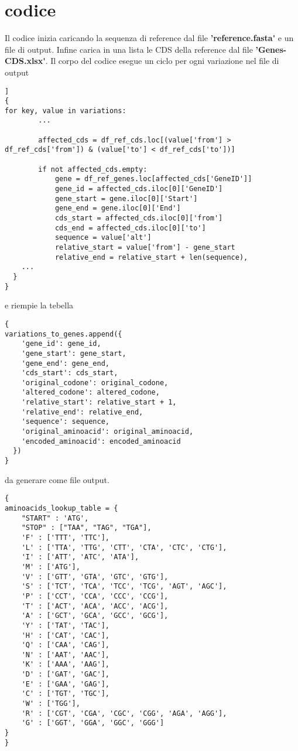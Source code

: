 \documentclass[11pt,italian]{article}
\begin{document}
\section{codice}
	Il codice inizia caricando la sequenza di reference dal file \textbf{'reference.fasta\'} e un file di output.\newline %
	Infine carica in una lista le CDS della reference dal file \textbf{'Genes-CDS.xlsx\'}. \newline
	Il  corpo del codice esegue un ciclo per ogni variazione nel file di output 
	\begin{lstlisting}[basicstyle=\small\ttfamily,caption=Porzione di ciclo,label=code:variations_to_genes = []]
{
for key, value in variations:
        ...
        
        affected_cds = df_ref_cds.loc[(value['from'] > df_ref_cds['from']) & (value['to'] < df_ref_cds['to'])]

        if not affected_cds.empty:
            gene = df_ref_genes.loc[affected_cds['GeneID']]
            gene_id = affected_cds.iloc[0]['GeneID']
            gene_start = gene.iloc[0]['Start']
            gene_end = gene.iloc[0]['End']
            cds_start = affected_cds.iloc[0]['from']
            cds_end = affected_cds.iloc[0]['to']
            sequence = value['alt']
            relative_start = value['from'] - gene_start
            relative_end = relative_start + len(sequence),
    ...
  }
}
\end{lstlisting}
	e riempie la tebella
\begin{lstlisting}[basicstyle=\small\ttfamily,caption=Appending nel file di output,label=code:variations_to_genes]
{
variations_to_genes.append({
	'gene_id': gene_id,
	'gene_start': gene_start,
	'gene_end': gene_end,
	'cds_start': cds_start,
	'original_codone': original_codone,
	'altered_codone': altered_codone,
	'relative_start': relative_start + 1,
	'relative_end': relative_end,
	'sequence': sequence,
	'original_aminoacid': original_aminoacid,
	'encoded_aminoacid': encoded_aminoacid
  })
}
\end{lstlisting}	
	da generare come file output.
	\newpage
\begin{lstlisting}[basicstyle=\small\ttfamily,caption=Tabella per la traduzione in amminoacidi,label=code:aminoacids_table]
{
aminoacids_lookup_table = {
    "START" : 'ATG',
    "STOP" : ["TAA", "TAG", "TGA"],
    'F' : ['TTT', 'TTC'],
    'L' : ['TTA', 'TTG', 'CTT', 'CTA', 'CTC', 'CTG'],
    'I' : ['ATT', 'ATC', 'ATA'],
    'M' : ['ATG'],
    'V' : ['GTT', 'GTA', 'GTC', 'GTG'],
    'S' : ['TCT', 'TCA', 'TCC', 'TCG', 'AGT', 'AGC'],
    'P' : ['CCT', 'CCA', 'CCC', 'CCG'],
    'T' : ['ACT', 'ACA', 'ACC', 'ACG'],
    'A' : ['GCT', 'GCA', 'GCC', 'GCG'],
    'Y' : ['TAT', 'TAC'],
    'H' : ['CAT', 'CAC'],
    'Q' : ['CAA', 'CAG'],
    'N' : ['AAT', 'AAC'],
    'K' : ['AAA', 'AAG'],
    'D' : ['GAT', 'GAC'],
    'E' : ['GAA', 'GAG'],
    'C' : ['TGT', 'TGC'],
    'W' : ['TGG'],
    'R' : ['CGT', 'CGA', 'CGC', 'CGG', 'AGA', 'AGG'],
    'G' : ['GGT', 'GGA', 'GGC', 'GGG']
}
}
\end{lstlisting}	
	
\end{document}
